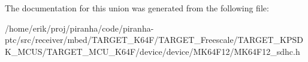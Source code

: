 The documentation for this union was generated from the following file\+:\begin{DoxyCompactItemize}
\item 
/home/erik/proj/piranha/code/piranha-\/ptc/src/receiver/mbed/\+T\+A\+R\+G\+E\+T\+\_\+\+K64\+F/\+T\+A\+R\+G\+E\+T\+\_\+\+Freescale/\+T\+A\+R\+G\+E\+T\+\_\+\+K\+P\+S\+D\+K\+\_\+\+M\+C\+U\+S/\+T\+A\+R\+G\+E\+T\+\_\+\+M\+C\+U\+\_\+\+K64\+F/device/device/\+M\+K64\+F12/M\+K64\+F12\+\_\+sdhc.\+h\end{DoxyCompactItemize}
